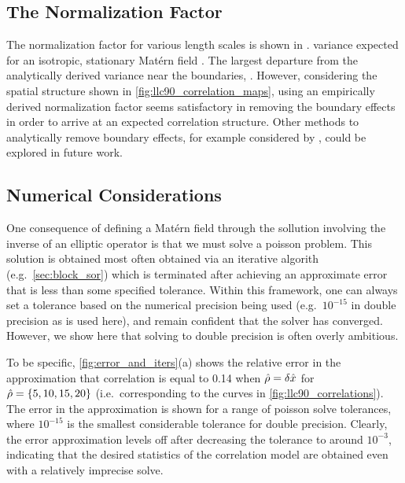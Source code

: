 \subsection{The Normalization Factor}
\label{ssec:llc90_boundary_effects}

The normalization factor for various length scales is shown in .
 variance expected for an isotropic, stationary Mat\'ern
field .
The largest departure from the analytically derived variance near the
boundaries, .
However, considering the spatial structure shown in
\cref{fig:llc90_correlation_maps}, using an empirically derived normalization
factor seems satisfactory in removing the boundary effects in order to arrive at
an expected correlation structure.
Other methods to analytically remove boundary effects, for example considered by
, could be explored in future work.

\subsection{Numerical Considerations}
\label{ssec:tolerance}

One consequence of defining a Mat\'ern field through the sollution involving the
inverse of an elliptic operator is that we must solve a poisson problem.
This solution is obtained most often obtained via an iterative algorith (e.g.\
\cref{sec:block_sor}) which is
terminated after achieving an approximate error that is less than some specified
tolerance.
Within this framework, one can always set a tolerance based on the numerical precision being used
(e.g.\ $10^{-15}$ in double precision as is used here), and remain confident
that the solver has converged.
However, we show here that solving to double precision is often overly ambitious.

To be specific, \cref{fig:error_and_iters}(a) shows the relative error in the
approximation that correlation is equal to 0.14 when $\hat{\rho} = \delta\hat{x}$
for $\hat{\rho} = \{5, 10, 15, 20\}$ (i.e.\ corresponding to the curves in
\cref{fig:llc90_correlations}).
The error in the approximation is shown for a range of poisson solve tolerances,
where $10^{-15}$ is the smallest considerable tolerance for double precision.
Clearly, the error approximation levels off after decreasing the tolerance to
around $10^{-3}$, indicating that the desired statistics of the correlation
model are obtained even with a relatively imprecise solve.


